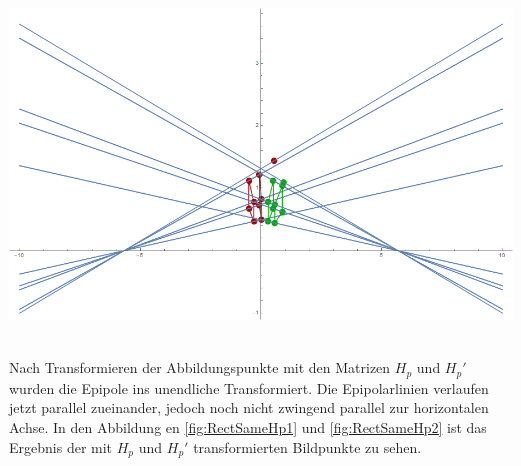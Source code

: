 \begin{minipage}{\linewidth}
	\centering
	\includegraphics[width=.8\linewidth]{images/Rectification_two_same_Solutions.png}
	\label{fig:RectOriginalELines}
\end{minipage}\\


Nach Transformieren der Abbildungspunkte mit den Matrizen $H_p$ und $H_p'$ wurden die Epipole ins unendliche Transformiert. Die Epipolarlinien verlaufen jetzt parallel zueinander, jedoch noch nicht zwingend parallel zur horizontalen Achse. In den Abbildung en \ref{fig:RectSameHp1} und \ref{fig:RectSameHp2} ist das Ergebnis der mit $H_p$ und $H_p'$ transformierten Bildpunkte zu sehen.




